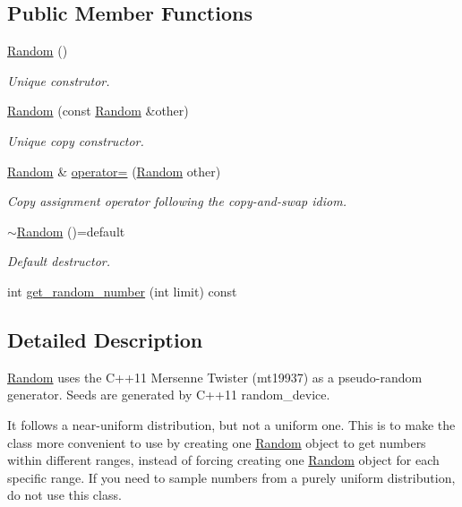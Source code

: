 \subsection*{Public Member Functions}
\begin{DoxyCompactItemize}
\item 
\hyperlink{classghost_1_1Random_a7c45efd1f7c522a68760104ba6084d89}{Random} ()
\begin{DoxyCompactList}\small\item\em Unique construtor. \end{DoxyCompactList}\item 
\hyperlink{classghost_1_1Random_aa57a39ee45a9ba30d7f7ea2c4c17b539}{Random} (const \hyperlink{classghost_1_1Random}{Random} \&other)
\begin{DoxyCompactList}\small\item\em Unique copy constructor. \end{DoxyCompactList}\item 
\hyperlink{classghost_1_1Random}{Random} \& \hyperlink{classghost_1_1Random_ab9257479f8e393fc8d205f6a05357ee6}{operator=} (\hyperlink{classghost_1_1Random}{Random} other)
\begin{DoxyCompactList}\small\item\em Copy assignment operator following the copy-\/and-\/swap idiom. \end{DoxyCompactList}\item 
\hyperlink{classghost_1_1Random_a5b2a324a97684d12174a6f97bdb43aaa}{$\sim$\+Random} ()=default
\begin{DoxyCompactList}\small\item\em Default destructor. \end{DoxyCompactList}\item 
int \hyperlink{classghost_1_1Random_acc4f1a79621ed8d77c303cecda571034}{get\+\_\+random\+\_\+number} (int limit) const 
\end{DoxyCompactItemize}


\subsection{Detailed Description}
\hyperlink{classghost_1_1Random}{Random} uses the C++11 Mersenne Twister (mt19937) as a pseudo-\/random generator. Seeds are generated by C++11 random\+\_\+device.

It follows a near-\/uniform distribution, but not a uniform one. This is to make the class more convenient to use by creating one \hyperlink{classghost_1_1Random}{Random} object to get numbers within different ranges, instead of forcing creating one \hyperlink{classghost_1_1Random}{Random} object for each specific range. If you need to sample numbers from a purely uniform distribution, do not use this class. 

